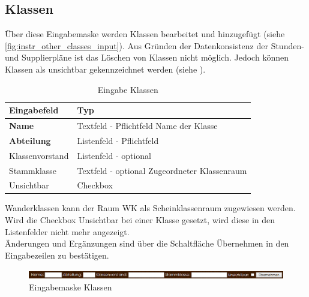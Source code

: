 \subsection{Klassen}
Über diese Eingabemaske werden Klassen bearbeitet und hinzugefügt (siehe \autoref{fig:instr_other_classes_input}). Aus Gründen der Datenkonsistenz der Stunden- und Supplierpläne ist das Löschen von Klassen nicht möglich. Jedoch können Klassen als unsichtbar gekennzeichnet werden (siehe ).
\begin{table}[H]
\centering
\begin{tabular}{p{3 cm}p{10 cm}}
   \toprule
   \textbf{Eingabefeld} & \textbf{Typ} \\
   \midrule
          \textbf{Name} & Textfeld - Pflichtfeld \newline Name der Klasse \\
          \hline
          \textbf{Abteilung} & Listenfeld - Pflichtfeld \\
          \hline
          Klassenvorstand & Listenfeld - optional \\
          \hline
          Stammklasse & Textfeld - optional \newline Zugeordneter Klassenraum \\
          \hline
          Unsichtbar & Checkbox \\
   \bottomrule
\end{tabular}
\caption{Eingabe Klassen}
\end{table}
Wanderklassen kann der Raum WK als Scheinklassenraum zugewiesen werden. Wird die Checkbox Unsichtbar bei einer Klasse gesetzt, wird diese in den Listenfelder nicht mehr angezeigt.\\
Änderungen und Ergänzungen sind über die Schaltfläche Übernehmen in den Eingabezeilen zu bestätigen.
\begin{figure}[H]
\centering
\includegraphics[keepaspectratio=true, width=17cm]{images/screenshots/classes_input.png}
\caption{Eingabemaske Klassen}
\label{fig:instr_other_classes_input}
\end{figure}
